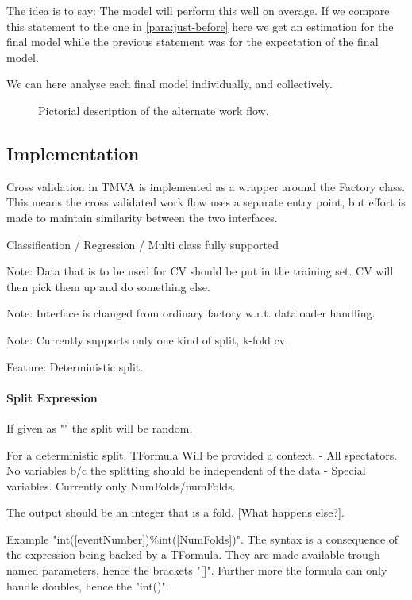 The idea is to say: The model will perform this well on average. If we compare this statement to the one in \ref{para:just-before} here we get an estimation for the final model while the previous statement was for the expectation of the final model.

We can here analyse each final model individually, and collectively.

\begin{center}
\begin{figure}
   \missingfigure{}
   \label{fig:workflow1}
   \caption{Pictorial description of the alternate work flow.}
\end{figure}
\end{center}

\subsection{Implementation}
Cross validation in TMVA is implemented as a wrapper around the Factory class. This means the cross validated work flow uses a separate entry point, but effort is made to maintain similarity between the two interfaces.

Classification / Regression / Multi class fully supported

Note: Data that is to be used for CV should be put in the training set. CV will then pick them up and do something else.

Note: Interface is changed from ordinary factory w.r.t. dataloader handling.

Note: Currently supports only one kind of split, k-fold cv.

Feature: Deterministic split.
\paragraph{Split Expression}
If given as "" the split will be random.

For a deterministic split.
TFormula
Will be provided a context.
 - All spectators. No variables b/c the splitting should be independent of the data
 - Special variables. Currently only NumFolds/numFolds.

The output should be an integer that is a fold. [What happens else?].

Example "int([eventNumber])\%int([NumFolds])". The syntax is a consequence of the expression being backed by a TFormula. They are made available trough named parameters, hence the brackets "[]". Further more the formula can only handle doubles, hence the "int()".

